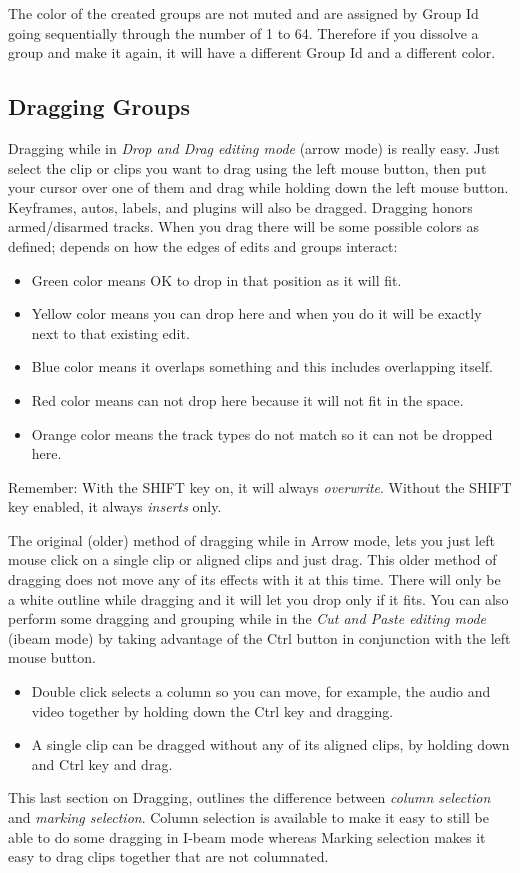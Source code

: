 The color of the created groups are not muted and are assigned by Group Id going sequentially through the number of 1 to 64.  Therefore if you dissolve a group and make it again, it will have a different Group Id and a different color.

\subsection{Dragging Groups}%
\label{sub:dragging_groups}

Dragging while in \textit{Drop and Drag editing mode} (arrow mode) is really easy.  Just select the clip or clips you want to drag using the left mouse button, then put your cursor over one of them and drag while holding down the left mouse button.  Keyframes, autos, labels, and plugins will also be dragged.   Dragging honors armed/disarmed tracks.  When you drag there will be some possible colors as defined; depends on how the edges of edits and groups interact:
\begin{itemize}
    \item Green color means OK to drop in that position as it will fit.
    \item Yellow color means you can drop here and when you do it will be exactly next to that existing edit.
    \item Blue color means it overlaps something and this includes overlapping itself.
    \item Red color means can not drop here because it will not fit in the space.
    \item Orange color means the track types do not match so it can not be dropped here.
\end{itemize}

Remember: With the SHIFT key on, it will always \textit{overwrite}. Without the SHIFT key enabled, it always \textit{inserts} only.

The original (older) method of dragging while in Arrow mode, lets you just left mouse click on a single clip or aligned clips and just drag.  This older method of dragging does not move any of its effects with it at this time.  There will only be a white outline while dragging and it will let you drop only if it fits.  You can also perform some dragging and grouping while in the \textit{Cut and Paste editing mode} (ibeam mode) by taking advantage of the Ctrl button in conjunction with the left mouse button.
\begin{itemize}
    \item Double click selects a column so you can move, for example, the audio and video together by holding
    down the Ctrl key and dragging.
    \item A single clip can be dragged without any of its aligned clips, by holding down and Ctrl key and drag.
\end{itemize}
This last section on Dragging, outlines the difference between \textit{column selection} and \textit{marking selection}.  Column selection is available to make it easy to still be able to do some dragging in I-beam mode whereas Marking selection makes it easy to drag clips together that are not columnated.

